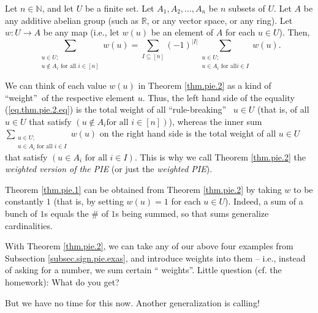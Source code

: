 \begin{theorem}
\label{thm.pie.2}Let $n\in\mathbb{N}$, and let
$U$ be a finite set. Let $A_{1},A_{2},\ldots,A_{n}$ be $n$ subsets of $U$. Let
$A$ be any additive abelian group (such as $\mathbb{R}$, or any vector space,
or any ring). Let $w:U\rightarrow A$ be any map (i.e., let $w\left(  u\right)
$ be an element of $A$ for each $u\in U$). Then,%
\begin{equation}
\sum_{\substack{u\in U;\\u\notin A_{i}\text{ for all }i\in\left[  n\right]
}}w\left(  u\right)  =\sum_{I\subseteq\left[  n\right]  }\left(  -1\right)
^{\left\vert I\right\vert }\sum_{\substack{u\in U;\\u\in A_{i}\text{ for all
}i\in I}}w\left(  u\right)  . \label{eq.thm.pie.2.eq}%
\end{equation}

\end{theorem}

We can think of each value $w\left(  u\right)  $ in Theorem \ref{thm.pie.2} as
a kind of \textquotedblleft weight\textquotedblright\ of the respective
element $u$. Thus, the left hand side of the equality (\ref{eq.thm.pie.2.eq})
is the total weight of all \textquotedblleft rule-breaking\textquotedblright%
\ $u\in U$ (that is, of all $u\in U$ that satisfy $\left(  u\notin A_{i}\text{
for all }i\in\left[  n\right]  \right)  $), whereas the inner sum
$\sum_{\substack{u\in U;\\u\in A_{i}\text{ for all }i\in I}}w\left(  u\right)
$ on the right hand side is the total weight of all $u\in U$ that satisfy
$\left(  u\in A_{i}\text{ for all }i\in I\right)  $. This is why we call
Theorem \ref{thm.pie.2} the \emph{weighted version of the PIE} (or just the
\emph{weighted PIE}).

Theorem \ref{thm.pie.1} can be obtained from Theorem \ref{thm.pie.2} by taking
$w$ to be constantly $1$ (that is, by setting $w\left(  u\right)  =1$ for each
$u\in U$). Indeed, a sum of a bunch of $1$s equals the \# of $1$s being
summed, so that sums generalize cardinalities.

With Theorem \ref{thm.pie.2}, we can take any of our above four examples from
Subsection \ref{subsec.sign.pie.exas}, and introduce weights into them --
i.e., instead of asking for a number, we sum certain \textquotedblleft
weights\textquotedblright. Little question (cf. the homework): What do you get?

But we have no time for this now. Another generalization is calling!

